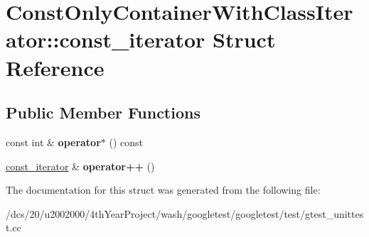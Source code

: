 \hypertarget{structConstOnlyContainerWithClassIterator_1_1const__iterator}{}\section{Const\+Only\+Container\+With\+Class\+Iterator\+:\+:const\+\_\+iterator Struct Reference}
\label{structConstOnlyContainerWithClassIterator_1_1const__iterator}
\subsection*{Public Member Functions}
\begin{DoxyCompactItemize}
\item 
\mbox{\label{structConstOnlyContainerWithClassIterator_1_1const__iterator_ac0e11dc5624359e4d13a9dfcc56586bc}} 
const int \& {\bfseries operator$\ast$} () const
\item 
\mbox{\label{structConstOnlyContainerWithClassIterator_1_1const__iterator_a99150bd6377f80d9944b95aa2a5c7805}} 
\mbox{\hyperlink{structConstOnlyContainerWithClassIterator_1_1const__iterator}{const\+\_\+iterator}} \& {\bfseries operator++} ()
\end{DoxyCompactItemize}


The documentation for this struct was generated from the following file\+:\begin{DoxyCompactItemize}
\item 
/dcs/20/u2002000/4th\+Year\+Project/wash/googletest/googletest/test/gtest\+\_\+unittest.\+cc\end{DoxyCompactItemize}
